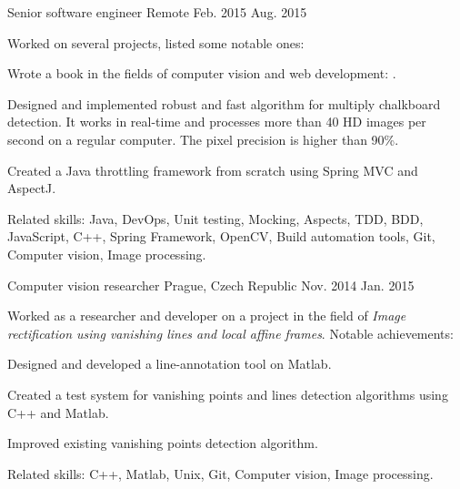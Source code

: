 \begin{cventries}
  \cventry
    {Senior software engineer} %
    {} %
    {Remote} %
    {Feb. 2015 \textemdash{} Aug. 2015} %
    {
    Worked on several projects, listed some notable ones:
      \begin{cvitems}
      \item{Wrote a book in the fields of computer vision and web development: .}
      \item{Designed and implemented robust and fast algorithm for multiply chalkboard detection. It works in real-time and processes more than 40 HD images per second on a regular computer. The pixel precision is higher than 90\%.}
      \item{Created a Java throttling framework from scratch using Spring MVC and AspectJ.}
      \end{cvitems}
      Related skills: Java, DevOps, Unit testing, Mocking, Aspects, TDD, BDD, JavaScript, C++, Spring Framework, OpenCV, Build automation tools, Git, Computer vision, Image processing.
    }

  \cventry
    {Computer vision researcher} %
    {} %
    {Prague, Czech Republic} %
    {Nov. 2014 \textemdash{} Jan. 2015} %
    {
	Worked as a researcher and developer on a project in the field of \textit{Image rectification using vanishing lines and local affine frames}. Notable achievements:
      \begin{cvitems}
      \item{Designed and developed a line-annotation tool on Matlab.}
      \item{Created a test system for vanishing points and lines detection algorithms using C++ and Matlab.}
      \item{Improved existing vanishing points detection algorithm.}
      \end{cvitems}
      Related skills: C++, Matlab, Unix, Git, Computer vision, Image processing.
    }


\end{cventries}
